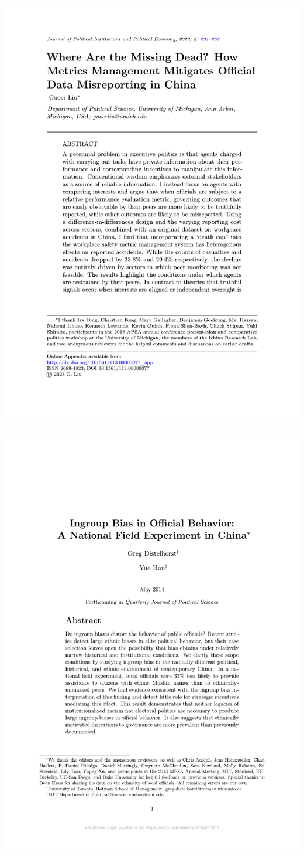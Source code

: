 \documentclass[
  10pt,
  ignorenonframetext,
]{beamer}
\begin{document}
\begin{frame}
\begin{center}\includegraphics[width=0.6\linewidth]{Figs/liu_cover} \end{center}
\end{frame}

\begin{frame}
\begin{center}\includegraphics[width=0.7\linewidth]{Figs/Examples/hou_cover} \end{center}
\end{frame}
\end{document}
